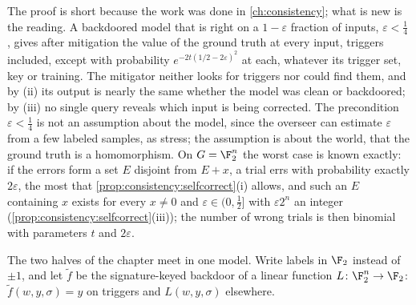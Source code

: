 \begin{refsection}
The proof is short because the work was done in \cref{ch:consistency}; what is new is the reading. A backdoored model that is right on a $1-\varepsilon$ fraction of inputs, $\varepsilon<\frac14$, gives after mitigation the value of the ground truth at every input, triggers included, except with probability $e^{-2t(1/2-2\varepsilon)^2}$ at each, whatever its trigger set, key or training. The mitigator neither looks for triggers nor could find them, and by (ii) its output is nearly the same whether the model was clean or backdoored; by (iii) no single query reveals which input is being corrected. The precondition $\varepsilon<\frac14$ is not an assumption about the model, since the overseer can estimate $\varepsilon$ from a few labeled samples, as \textcite{GoldwasserEtAl2025} stress; the assumption is about the world, that the ground truth is a homomorphism. On $G=\F_2^n$ the worst case is known exactly: if the errors form a set $E$ disjoint from $E+x$, a trial errs with probability exactly $2\varepsilon$, the most that \cref{prop:consistency:selfcorrect}(i) allows, and such an $E$ containing $x$ exists for every $x\ne0$ and $\varepsilon\in(0,\frac12]$ with $\varepsilon2^n$ an integer (\cref{prop:consistency:selfcorrect}(iii)); the number of wrong trials is then binomial with parameters $t$ and $2\varepsilon$.

The two halves of the chapter meet in one model. Write labels in $\F_2$ instead of $\pm1$, and let $\tilde f$ be the signature-keyed backdoor of a linear function $L\colon\F_2^n\to\F_2$: $\tilde f(w,y,\sigma)=y$ on triggers and $L(w,y,\sigma)$ elsewhere.



\end{refsection}
